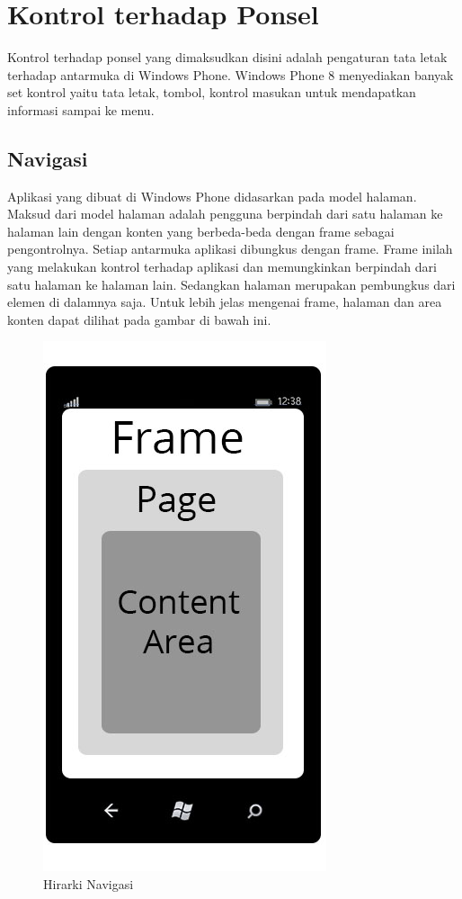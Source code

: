 \section{Kontrol terhadap Ponsel}
\label{sec:Kontrol terhadap Ponsel}
\hspace{0.5cm} Kontrol terhadap ponsel yang dimaksudkan disini adalah pengaturan tata letak terhadap antarmuka di Windows Phone. Windows Phone 8 menyediakan banyak set kontrol yaitu tata letak, tombol, kontrol masukan untuk mendapatkan informasi sampai ke menu. 

\subsection{Navigasi}
\label{subsec:Navigasi}
\hspace{0.5cm} Aplikasi yang dibuat di Windows Phone didasarkan pada model halaman. Maksud dari model halaman adalah pengguna berpindah dari satu halaman ke halaman lain dengan konten yang berbeda-beda dengan frame sebagai pengontrolnya. Setiap antarmuka aplikasi dibungkus dengan frame. Frame inilah yang melakukan kontrol terhadap aplikasi dan memungkinkan berpindah dari satu halaman ke halaman lain. Sedangkan halaman merupakan pembungkus dari elemen di dalamnya saja. Untuk lebih jelas mengenai frame, halaman dan area konten dapat dilihat pada gambar di bawah ini.

\begin{figure}[h]
	\centering
		\includegraphics[scale=0.5]{Gambar/nav_hierarchy}
	\caption{Hirarki Navigasi}
	\label{fig:nav_hierarchy}
\end{figure}


